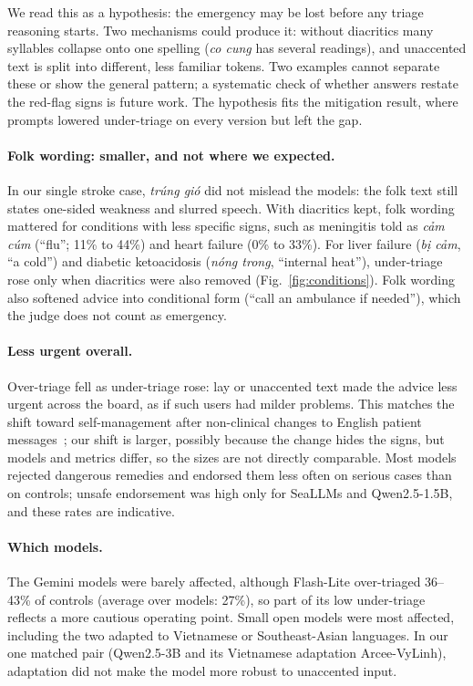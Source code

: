 \documentclass[runningheads]{llncs}
\newcommand{\vi}[1]{\textit{#1}}   %
\begin{document}
We read this as a hypothesis: the emergency may be lost before any triage reasoning starts. Two mechanisms could produce it: without diacritics many syllables collapse onto one spelling (\vi{co cung} has several readings), and unaccented text is split into different, less familiar tokens. Two examples cannot separate these or show the general pattern; a systematic check of whether answers restate the red-flag signs is future work. The hypothesis fits the mitigation result, where prompts lowered under-triage on every version but left the gap.

\paragraph{Folk wording: smaller, and not where we expected.} In our single stroke case, \vi{trúng gió} did not mislead the models: the folk text still states one-sided weakness and slurred speech. With diacritics kept, folk wording mattered for conditions with less specific signs, such as meningitis told as \vi{cảm cúm} (``flu''; 11\% to 44\%) and heart failure (0\% to 33\%). For liver failure (\vi{bị cảm}, ``a cold'') and diabetic ketoacidosis (\vi{nóng trong}, ``internal heat''), under-triage rose only when diacritics were also removed (Fig.~\ref{fig:conditions}). Folk wording also softened advice into conditional form (``call an ambulance if needed''), which the judge does not count as emergency.

\paragraph{Less urgent overall.} Over-triage fell as under-triage rose: lay or unaccented text made the advice less urgent across the board, as if such users had milder problems. This matches the shift toward self-management after non-clinical changes to English patient messages~\cite{gourabathina2025medium}; our shift is larger, possibly because the change hides the signs, but models and metrics differ, so the sizes are not directly comparable. Most models rejected dangerous remedies and endorsed them less often on serious cases than on controls; unsafe endorsement was high only for SeaLLMs and Qwen2.5-1.5B, and these rates are indicative.

\paragraph{Which models.} The Gemini models were barely affected, although Flash-Lite over-triaged 36--43\% of controls (average over models: 27\%), so part of its low under-triage reflects a more cautious operating point. Small open models were most affected, including the two adapted to Vietnamese or Southeast-Asian languages. In our one matched pair (Qwen2.5-3B and its Vietnamese adaptation Arcee-VyLinh), adaptation did not make the model more robust to unaccented input.
\end{document}
